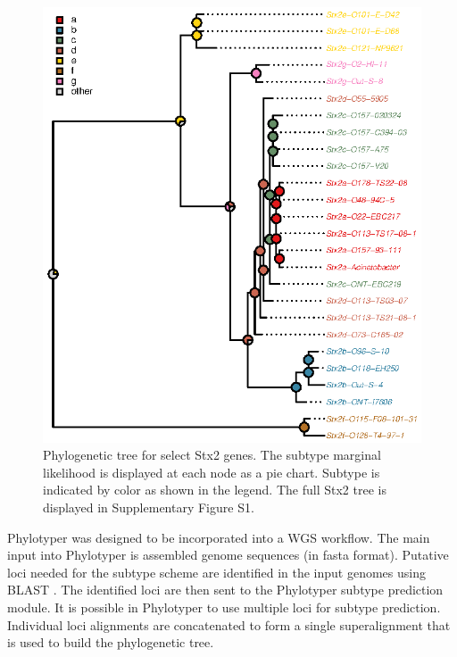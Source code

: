 \documentclass{bioinfo}
\begin{document}
\begin{figure}[!tpb]%
\centerline{\includegraphics{fig01.eps}}
\caption{Phylogenetic tree for select Stx2 genes. 
The subtype marginal likelihood is displayed at each node as a pie chart. Subtype is indicated by color as shown in the legend. The full Stx2 tree is displayed in Supplementary Figure S1.}\label{fig:01}
\end{figure}

Phylotyper was designed to be incorporated into a WGS workflow.  
The main input into Phylotyper is assembled genome sequences (in fasta format).  
Putative loci needed for the subtype scheme are identified in the input genomes using BLAST \citep{Camacho2009}.
The identified loci are then sent to the Phylotyper subtype prediction module.
It is possible in Phylotyper to use multiple loci for subtype prediction.
Individual loci alignments are concatenated to form a single superalignment that is used to build the phylogenetic tree.
\end{document}
